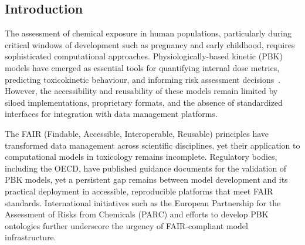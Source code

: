 \documentclass[preprint,12pt]{elsarticle}
\begin{document}
\begin{linenumbers}
\section{Introduction}\label{sec1}

The assessment of chemical exposure in human populations, particularly
during critical windows of development such as pregnancy and early
childhood, requires sophisticated computational approaches.
Physiologically-based kinetic (PBK) models have emerged as essential
tools for quantifying internal dose metrics, predicting toxicokinetic
behaviour, and informing risk assessment decisions~\cite{rabier2008,
welch2005, andersen2003}. However, the accessibility and reusability
of these models remain limited by siloed implementations, proprietary
formats, and the absence of standardized interfaces for integration
with data management platforms.

The FAIR (Findable, Accessible, Interoperable, Reusable) principles
\cite{wilkinson2016} have transformed data management across scientific
disciplines, yet their application to computational models in toxicology
remains incomplete. Regulatory bodies, including the OECD, have
published guidance documents for the validation of PBK models, yet a
persistent gap remains between model development and its practical
deployment in accessible, reproducible platforms that meet FAIR
standards. International initiatives such as the European Partnership
for the Assessment of Risks from Chemicals (PARC) and efforts to
develop PBK ontologies further underscore the urgency of
FAIR-compliant model infrastructure.



\end{linenumbers}
\end{document}
